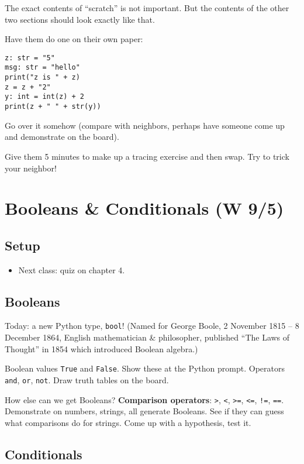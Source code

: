 \documentclass{article}
\begin{document}
The exact contents of ``scratch'' is not important.  But the contents
of the other two sections should look exactly like that.

Have them do one on their own paper:

\begin{verbatim}
z: str = "5"
msg: str = "hello"
print("z is " + z)
z = z + "2"
y: int = int(z) + 2
print(z + " " + str(y))
\end{verbatim}

Go over it somehow (compare with neighbors, perhaps have someone come
up and demonstrate on the board).

Give them 5 minutes to make up a tracing exercise and then swap.  Try
to trick your neighbor!

\newpage

\section{Booleans \& Conditionals (W 9/5)}

\subsection*{Setup}

\begin{itemize}
\item Next class: quiz on chapter 4.
\end{itemize}

\subsection*{Booleans}

Today: a new Python type, {\tt bool}! (Named for George Boole, 2
November 1815 -- 8 December 1864, English mathematician \&
philosopher, published ``The Laws of Thought'' in 1854 which
introduced Boolean algebra.)

Boolean values {\tt True} and {\tt False}.  Show these at the Python
prompt.  Operators {\tt and}, {\tt or}, {\tt not}.  Draw truth tables
on the board.

How else can we get Booleans?  \textbf{Comparison operators}:
\verb|>|, \verb|<|, \verb|>=|, \verb|<=|, \verb|!=|, \verb|==|.
Demonstrate on numbers, strings, all generate Booleans.  See if they
can guess what comparisons do for strings.  Come up with a hypothesis,
test it.

\subsection*{Conditionals}
\end{document}
